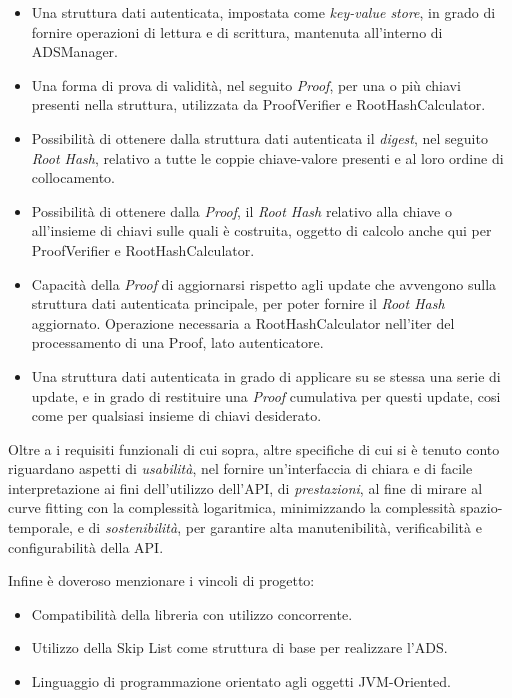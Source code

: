 	\begin{itemize}
		\item Una struttura dati autenticata, impostata come \textit{key-value store}, in grado di fornire operazioni di lettura e di scrittura, mantenuta all'interno di ADSManager.
		\item Una forma di prova di validità, nel seguito \textit{Proof}, per una o più chiavi presenti nella struttura, utilizzata da ProofVerifier e RootHashCalculator.
		\item Possibilità di ottenere dalla struttura dati autenticata il \textit{digest}, nel seguito \textit{Root Hash}, relativo a tutte le coppie chiave-valore presenti e al loro ordine di collocamento.
		\item Possibilità di ottenere dalla \textit{Proof}, il \textit{Root Hash} relativo alla chiave o all'insieme di chiavi sulle quali è costruita, oggetto di calcolo anche qui per ProofVerifier e RootHashCalculator.
		\item Capacità della \textit{Proof} di aggiornarsi rispetto agli update che avvengono sulla struttura dati autenticata principale, per poter fornire il \textit{Root Hash} aggiornato. Operazione necessaria a RootHashCalculator nell'iter del processamento di una Proof, lato autenticatore.
 		\item Una struttura dati autenticata in grado di applicare su se stessa una serie di update, e in grado di restituire una \textit{Proof} cumulativa per questi update, cosi come per qualsiasi insieme di chiavi desiderato.
	\end{itemize}
	
	Oltre a i requisiti funzionali di cui sopra, altre specifiche di cui si è tenuto conto riguardano aspetti di \textit{usabilità}, nel fornire un'interfaccia di chiara e di facile interpretazione ai fini dell'utilizzo dell'API, di \textit{prestazioni}, al fine di mirare al curve fitting con la complessità logaritmica, minimizzando la complessità spazio-temporale, e di \textit{sostenibilità}, per garantire alta manutenibilità, verificabilità e configurabilità della API.
	
	Infine è doveroso menzionare i vincoli di progetto:
	\begin{itemize}
		\item Compatibilità della libreria con utilizzo concorrente.
		\item Utilizzo della Skip List come struttura di base per realizzare l'ADS.
		\item Linguaggio di programmazione orientato agli oggetti JVM-Oriented.
	\end{itemize}

